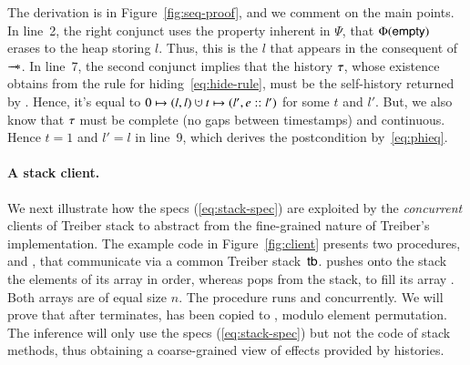 The derivation is in Figure~\ref{fig:seq-proof}, and we comment on the
main points. In line~2, the right conjunct uses the property inherent
in $\Psi$, that $\Phi(\mathsf{empty})$ erases to the heap storing $l$. Thus,
this is the $l$ that appears in the consequent of $\mathop{-\!\!\!\!-\!\!\!\ast}$. In line~7,
the second conjunct implies that the history $\tau$, whose existence
obtains from the rule for hiding~\eqref{eq:hide-rule}, must be the
self-history returned by . Hence, it's equal to $0 \hpts
(l, l) \hunion t \hpts (l', e::l')$ for some $t$ and $l'$. But, we
also know that $\tau$ must be complete (no gaps between timestamps)
and continuous. Hence $t = 1$ and $l' = l$ in line~9, which derives
the postcondition by~\eqref{eq:phieq}.

\paragraph{A stack client.}
%
We next illustrate how the specs (\ref{eq:stack-spec}) are exploited
by the \emph{concurrent} clients of Treiber stack to abstract from the
fine-grained nature of Treiber's implementation.
%
%
The example code in Figure~\ref{fig:client} presents two procedures,
 and , that communicate via a common
Treiber stack~$\mathsf{tb}$.  pushes onto the stack the
elements of its array  in order, whereas  pops
from the stack, to fill its array . Both arrays are of equal
size $n$. The procedure  runs  and
 concurrently. We will prove that after 
terminates,  has been copied to , modulo element
permutation. The inference will only use the specs
(\ref{eq:stack-spec}) but not the code of stack methods, thus
obtaining a coarse-grained view of effects provided by histories.

